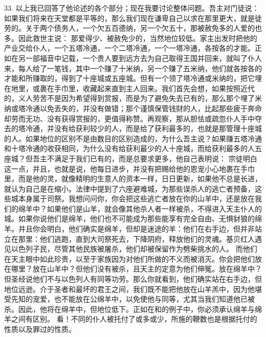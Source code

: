 33. 以上我已回答了他论述的各个部分；现在我要讨论整体问题。吾主对门徒说：  如果我们将来在天堂都是平等的，那么我们现在谦卑自己以求在那里更大，就是徒劳的。关于两个债务人，一个欠五百德纳，另一个欠五十，那被赦免多的人爱的也多。因此救世主说：  那爱得少、被赦免少的，当然地位较低。家主出发时把他的产业交给仆人，一个五塔冷通，一个二塔冷通，一个一塔冷通，各按各的才能。正如在另一部福音中记载，一个贵人要到远方去为自己取得王国并回来，就叫了仆人来，每人给了一笔钱，其中一个赚了十米纳，另一个赚了五米纳，他们就各按各的才能和所赚取的，得到了十座城或五座城。但有一个领了塔冷通或米纳的，把它埋在地里，或裹在手巾里，收藏起来直到主人回来。我们首先会想，如果按照近代的，义人劳苦不是因为希望得到赏报，而是为了避免失去已有的，那么那个埋了米纳或塔冷通以免丢失的，并没有做错；那个谨慎保管钱财的人，比起那些疲于奔命却劳而无功、没有获得赏报的，更值得称赞。再观察，那从胆怯或疏忽仆人手中夺去的塔冷通，并没有给获利较少的人，而是给了获利最多的，也就是那管理十座城的人。如果地位的区别不是由数目的区别造成的，为什么吾主说？如果赚五塔冷通和十塔冷通的收获相同，为什么没有给获利最少的人十座城，而给获利最多的人五座城？但吾主不满足于我们已有的，而是总要求更多，他自己表明说： 宗徒明白这一点，并且，也就是说，他每日进步，并没有把赐给他的恩宠小心地裹在手巾里，而是他的灵，就像精明的生意人的资本一样，日日更新，如果他不总是长进，就认为自己是在缩小。法律中提到了六座避难城，为那些误杀人的逃亡者预备，这些城本身属于司祭。我想问问你，你会把这些逃亡者放在你的山羊中，还是放在我们的绵羊中？如果他们是山羊，就会像其他杀人者一样被杀，不得进入天主仆人的城。如果你说他们是绵羊，他们也不可能成为那些能享有完全自由、无惧豺狼的绵羊。并且你会明白，他们确实是绵羊，但却是迷途的羊：他们在右手边，但并非站立在那里：他们逃跑，直到大司祭死去，下降阴府，释放他们的灵魂。基贝红人遇见以色列子民，尽管其他民族被屠杀，他们却被保留作为劈柴挑水的人。 而他们在天主眼中如此珍贵，以至于家族因为对他们所做的不义而被消灭。你会把他们放在哪里？放在山羊中？但他们没有被杀，且天主的定意为他们伸冤。放在绵羊中？但圣经说他们不与以色列人有同等功劳。那么你就看到，他们确实站在右手边，但地位远逊。介于圣者和最坏的君王之间，我们既不能把他放在山羊羔中，因为他堪受先知的宠爱，也不能放在公绵羊中，以免使他与同等，尤其当我们知道他已被杀。因此，他将在绵羊中，但地位低下。正如在和的例子中，你必须承认绵羊与绵羊之间有区别。  看！不同的仆人被托付了或多或少，所施的鞭数也是根据托付的性质以及罪过的性质。\par

